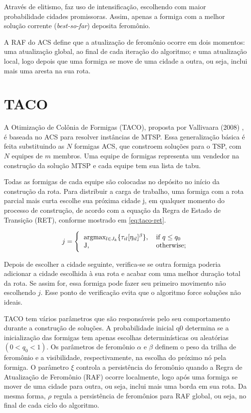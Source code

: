 Através de elitismo, faz uso de intensificação, escolhendo com maior probabilidade cidades promissoras. Assim, apenas a formiga com a melhor solução corrente (\textit{best-so-far}) deposita feromônio.

A RAF do ACS define que a atualização de feromônio ocorre em dois momentos: uma atualização global, ao final de cada iteração do algoritmo; e uma atualização local, logo depois que uma formiga se move de uma cidade a outra, ou seja, inclui mais uma aresta na sua rota.

\section{TACO}
\label{sec-taco}

A Otimização de Colônia de Formigas (TACO), proposta por Vallivaara (2008) \cite{vallivaara2008team}, é baseada no ACS para resolver instâncias de MTSP. Essa generalização básica é feita substituindo as $N$ formigas ACS, que constroem soluções para o TSP, com $N$ equipes de $m$ membros. Uma equipe de formigas representa um vendedor na construção da solução MTSP e cada equipe tem sua lista de tabu.

Todas as formigas de cada equipe são colocadas no depósito no início da construção da rota. Para distribuir a carga de trabalho, uma formiga com a rota parcial mais curta escolhe sua próxima cidade j, em qualquer momento do processo de construção, de acordo com a equação da Regra de Estado de Transição (RET), conforme mostrado em \ref{eq:taco-ret}.

\begin{equation} \label{eq:taco-ret} 
    j = \Bigg\{
        \begin{tabular}{ll}
        argmax\(_{l \in J_k} \{\tau_{il}[\eta_{il}]^\beta\}\), & if $q \leq q_0$ \\
        J, & otherwise;
        \end{tabular}
\end{equation}

Depois de escolher a cidade seguinte, verifica-se se outra formiga poderia adicionar a cidade escolhida à sua rota e acabar com uma melhor duração total da rota. Se assim for, essa formiga pode fazer seu primeiro movimento não escolhendo $j$. Esse ponto de verificação evita que o algoritmo force soluções não ideais.

TACO tem vários parâmetros que são responsáveis pelo seu comportamento durante a construção de soluções. A probabilidade inicial q0 determina se a inicialização das formigas tem apenas escolhas determinísticas ou aleatórias $(0 < q_0 <1)$. Os parâmetros de feromônio $\alpha$ e $\beta$ definem o peso da trilha de feromônio e a visibilidade, respectivamente, na escolha do próximo nó pela formiga. O parâmetro $\xi$ controla a persistência do feromônio quando a Regra de Atualização de Feromônio (RAF) ocorre localmente, logo após uma formiga se mover de uma cidade para outra, ou seja, inclui mais uma borda em sua rota. Da mesma forma, $\rho$ regula a persistência de feromônios para RAF global, ou seja, no final de cada ciclo do algoritmo.

